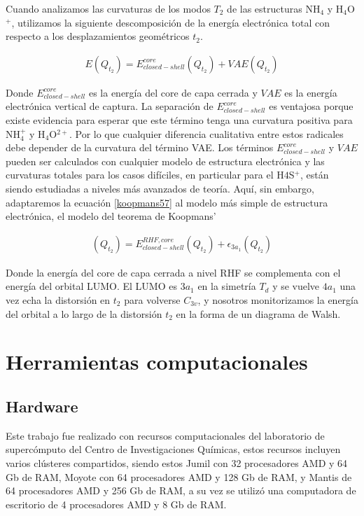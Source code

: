 \documentclass[12pt]{report}
\begin{document}
Cuando analizamos las curvaturas de los modos $T_2$ de las estructuras NH$_4$ y H$_4$O$^+$, utilizamos la siguiente descomposición de la energía electrónica total con respecto a los desplazamientos geométricos $t_2$.

\begin{align}
E(Q_{t_2})=E_{closed-shell}^{core}(Q_{t_2})+VAE(Q_{t_2})
\label{koopmans57}
\end{align}

Donde $E_{closed-shell}^{core}$ es la energía del core de capa cerrada y $VAE$ es la energía electrónica vertical de captura. La separación de $E_{closed-shell}^{core}$ es ventajosa porque existe evidencia para esperar que este término tenga una curvatura positiva para NH$_4^+$ y H$_4$O$^{2+}$. Por lo que cualquier diferencia cualitativa entre estos radicales debe depender de la curvatura del término VAE. Los términos $E_{closed-shell}^{core}$  y $VAE$ pueden ser calculados con cualquier modelo de estructura electrónica y las curvaturas totales para los casos difíciles, en particular para el H$4$S$^+$, están siendo estudiadas a niveles más avanzados de teoría. Aquí, sin embargo, adaptaremos la ecuación \ref{koopmans57} al modelo más simple de estructura electrónica, el modelo del teorema de Koopmans’\cite{Koopmans}

\begin{align}
(Q_{t_2})=E_{closed-shell}^{RHF,core}(Q_{t_2})+\epsilon_{3a_1}(Q_{t_2})
\label{koopmans58}
\end{align}

Donde la energía del core de capa cerrada a nivel RHF se complementa con el energía del orbital LUMO. El LUMO es $3a_1$ en la simetría $T_d$ y se vuelve $4a_1$ una vez echa la distorsión en $t_2$ para volverse $C_{3v}$, y nosotros monitorizamos la energía del orbital a lo largo de la distorsión $t_2$ en la forma de un diagrama de Walsh.\cite{Walsh}

\newpage

\section{Herramientas computacionales}

\subsection{Hardware}

Este trabajo fue realizado con recursos computacionales del laboratorio de supercómputo del Centro de Investigaciones Químicas, estos recursos incluyen varios clústeres compartidos, siendo estos Jumil con 32 procesadores AMD y 64 Gb de RAM, Moyote con 64 procesadores AMD y 128 Gb de RAM, y Mantis de 64 procesadores AMD y 256 Gb de RAM, a su vez se utilizó una computadora de escritorio de 4 procesadores AMD y 8 Gb de RAM.
\end{document}
